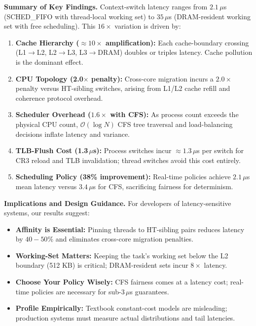 \documentclass[conference]{IEEEtran}
\begin{document}
\textbf{Summary of Key Findings.}  Context-switch latency ranges from $2.1\,\mu$s
(SCHED\_FIFO with thread-local working set) to $35\,\mu$s (DRAM-resident working
set with free scheduling). This $16\times$ variation is driven by:

\begin{enumerate}
  \item \textbf{Cache Hierarchy ($\approx 10\times$ amplification):}
        Each cache-boundary crossing (L1$\to$L2, L2$\to$L3, L3$\to$DRAM)
        doubles or triples latency. Cache pollution is the dominant effect.

  \item \textbf{CPU Topology (2.0$\times$ penalty):}
        Cross-core migration incurs a $2.0\times$ penalty versus HT-sibling switches,
        arising from L1/L2 cache refill and coherence protocol overhead.

  \item \textbf{Scheduler Overhead ($1.6\times$ with CFS):}
        As process count exceeds the physical CPU count, $\mathcal{O}(\log N)$ CFS
        tree traversal and load-balancing decisions inflate latency and variance.

  \item \textbf{TLB-Flush Cost (1.3$\,\mu$s):}
        Process switches incur $\approx 1.3\,\mu$s per switch for CR3 reload and
        TLB invalidation; thread switches avoid this cost entirely.

  \item \textbf{Scheduling Policy (38\% improvement):}
        Real-time policies achieve $2.1\,\mu$s mean latency versus $3.4\,\mu$s for
        CFS, sacrificing fairness for determinism.
\end{enumerate}

\textbf{Implications and Design Guidance.}
For developers of latency-sensitive systems, our results suggest:

\begin{itemize}
  \item \textbf{Affinity is Essential:} Pinning threads to HT-sibling pairs reduces
        latency by $40-50\%$ and eliminates cross-core migration penalties.

  \item \textbf{Working-Set Matters:} Keeping the task's working set below the L2
        boundary (512 KB) is critical; DRAM-resident sets incur $8\times$ latency.

  \item \textbf{Choose Your Policy Wisely:} CFS fairness comes at a latency cost;
        real-time policies are necessary for sub-$3\,\mu$s guarantees.

  \item \textbf{Profile Empirically:} Textbook constant-cost models are misleading;
        production systems must measure actual distributions and tail latencies.
\end{itemize}
\end{document}

